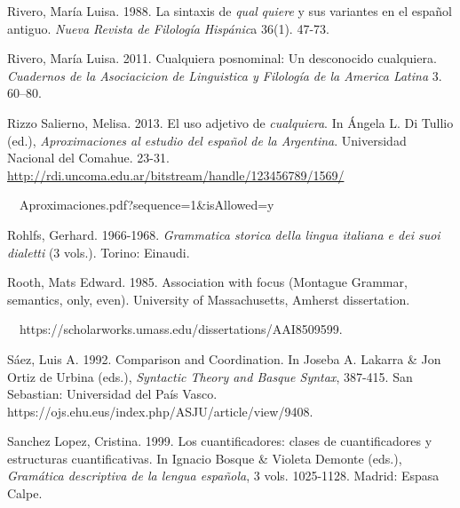\begin{styleStandard}
Rivero, María Luisa. 1988. La sintaxis de \textit{qual} \textit{quiere} y sus variantes en el español antiguo. \textit{Nueva Revista de Filología} \textit{Hispánic}a 36(1). 47-73.
\end{styleStandard}

\begin{styleStandard}
Rivero, María Luisa. 2011. Cualquiera posnominal: Un desconocido cualquiera. \textit{Cuadernos de la Asociacicion de Linguistica y Filología de la America Latina} 3. 60–80.
\end{styleStandard}

\begin{styleStandard}
Rizzo Salierno, Melisa. 2013. El uso adjetivo de \textit{cualquiera}. In Ángela L. Di Tullio (ed.), \textit{Aproximaciones al estudio del espa\~{n}ol de la Argentina}. Universidad Nacional del Comahue. 23-31. \url{http://rdi.uncoma.edu.ar/bitstream/handle/123456789/1569/}
\end{styleStandard}

\begin{styleStandard}
\ \ Aproximaciones.pdf?sequence=1\&isAllowed=y
\end{styleStandard}

\begin{styleStandard}
Rohlfs, Gerhard. 1966-1968. \textit{Grammatica storica della lingua italiana e dei suoi dialetti }(3 vols.). Torino: Einaudi. 
\end{styleStandard}

\begin{styleStandard}
Rooth, Mats Edward. 1985. Association with focus (Montague Grammar, semantics, only, even). University of Massachusetts, Amherst dissertation.~
\end{styleStandard}

\begin{styleStandard}
\ \ https://scholarworks.umass.edu/dissertations/AAI8509599.
\end{styleStandard}

\begin{styleStandard}
Sáez, Luis A. 1992. Comparison and Coordination. In Joseba A. Lakarra \& Jon Ortiz de Urbina (eds.), \textit{Syntactic Theory and Basque Syntax}, 387-415. San Sebastian: Universidad del País Vasco. https://ojs.ehu.eus/index.php/ASJU/article/view/9408.
\end{styleStandard}

\begin{styleStandard}
Sanchez Lopez, Cristina. 1999. Los cuantificadores: clases de cuantificadores y estructuras cuantificativas. In Ignacio Bosque \& Violeta Demonte (eds.), \textit{Gramática descriptiva de la lengua española}, 3 vols. 1025-1128. Madrid: Espasa Calpe.
\end{styleStandard}


